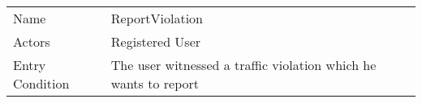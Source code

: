 \begin{table}[]
\begin{tabular}{ll}

Name            & ReportViolation                                                                                                                                                                                                                                                                                                                                                                                                                                                                                                                                                                                                                                                                                                                                                                              \\
Actors          & Registered User                                                                                                                                                                                                                                                                                                                                                                                                                                                                                                                                                                                                                                                                                                                                                                              \\
Entry Condition & The user witnessed a traffic violation which he wants to report                                                                                                                                                                                                                                                                                                                                                                                                                                                                                                                                                                                                                                                                                                                              \\

\end{tabular}
\end{table}
